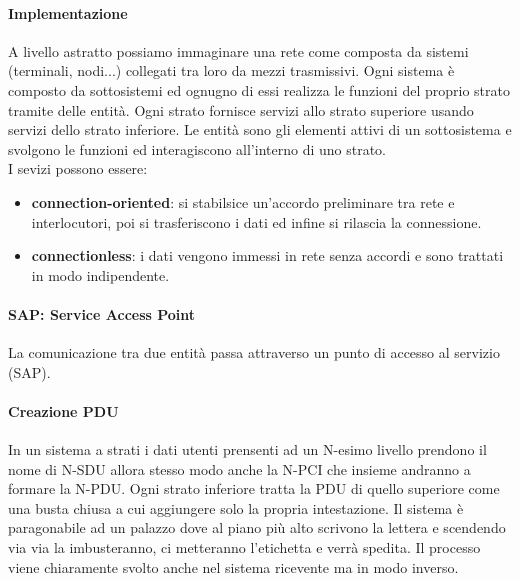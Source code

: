 \documentclass[12pt]{article}
\begin{document}
\paragraph{Implementazione}
A livello astratto possiamo immaginare una rete come composta da sistemi (terminali, nodi...) collegati tra loro da mezzi trasmissivi. Ogni sistema è composto da sottosistemi ed ognugno di essi realizza le funzioni del proprio strato tramite delle entità. Ogni strato fornisce servizi allo strato superiore usando servizi dello strato inferiore. Le entità sono gli elementi attivi di un sottosistema e svolgono le funzioni ed interagiscono all'interno di uno strato.\\
I sevizi possono essere:
\begin{itemize}
  \item \textbf{connection-oriented}: si stabilsice un'accordo preliminare tra rete e interlocutori, poi si trasferiscono i dati ed infine si rilascia la connessione.
  \item \textbf{connectionless}: i dati vengono immessi in rete senza accordi e sono trattati in modo indipendente.
\end{itemize}

\paragraph{SAP: Service Access Point}
La comunicazione tra due entità passa attraverso un punto di accesso al servizio (SAP).

\paragraph{Creazione PDU}
In un sistema a strati i dati utenti prensenti ad un N-esimo livello prendono il nome di N-SDU allora stesso modo anche la N-PCI che insieme andranno a formare la N-PDU. Ogni strato inferiore tratta la PDU di quello superiore come una busta chiusa a cui aggiungere solo la propria intestazione. Il sistema è paragonabile ad un palazzo dove al piano più alto scrivono la lettera e scendendo via via la imbusteranno, ci metteranno l'etichetta e verrà spedita. Il processo viene chiaramente svolto anche nel sistema ricevente ma in modo inverso.
\end{document}
